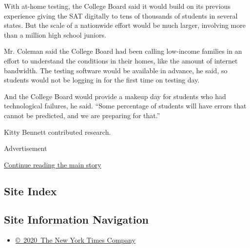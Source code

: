 With at-home testing, the College Board said it would build on its
previous experience giving the SAT digitally to tens of thousands of
students in several states. But the scale of a nationwide effort would
be much larger, involving more than a million high school juniors.

Mr. Coleman said the College Board had been calling low-income families
in an effort to understand the conditions in their homes, like the
amount of internet bandwidth. The testing software would be available in
advance, he said, so students would not be logging in for the first time
on testing day.

And the College Board would provide a makeup day for students who had
technological failures, he said. ``Some percentage of students will have
errors that cannot be predicted, and we are preparing for that.''

Kitty Bennett contributed research.

Advertisement

\protect\hyperlink{after-bottom}{Continue reading the main story}

\hypertarget{site-index}{%
\subsection{Site Index}\label{site-index}}

\hypertarget{site-information-navigation}{%
\subsection{Site Information
Navigation}\label{site-information-navigation}}

\begin{itemize}
\tightlist
\item
  \href{https://help.nytimes.com/hc/en-us/articles/115014792127-Copyright-notice}{©~2020~The
  New York Times Company}
\end{itemize}

